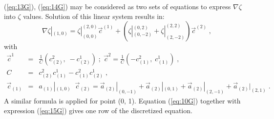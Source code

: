 \documentclass[12pt]{book}
\begin{document}
(\ref{eq:13G}), (\ref{eq:14G}) may be considered as two sets of equations
to express $\nabla \zeta$ into $\zeta$ values. Solution of this linear
system results in:
\begin{equation}
\nabla \zeta |_{(1,0)} = \zeta |^{(2,0)}_{(0,0)} \vec{c}^{(1)} +
(\zeta|^{(0,2)}_{(0, -2)} + \zeta |^{(2,2)}_{(2,-2)})\vec{c}^{(2)}\;,
\label{eq:15G}
\end{equation}
with
\begin{eqnarray}
\vec{c}^{1}&=&\frac{1}{C}(c^{2}_{(2)}, \; -c^{1}_{(2)})\; ; \; \vec{c}^{2} =
\frac{1}{C}(-c^{2}_{(1)}, \; c^{1}_{(1)})\;,\label{eq:16aG}\\
C&=&c^{2}_{(2)}c^{1}_{(1)} - c^{2}_{(1)}c^{1}_{(2)}\;,\label{eq:16bG}\\
\vec{c}_{(1)}&=&a_{(1)}|_{(1,0)}\; \; \vec{c}_{(2)} = \vec{a}_{(2)}|_{(0,-1)} +
\vec{a}_{(2)}|_{(0,1)} + \vec{a}_{(2)}|_{(2, -1)} + \vec{a}_{(2)}|_{(2,1)}\;.
\label{eq:16c}
\end{eqnarray}
A similar formula is applied for point (0, 1). Equation (\ref{eq:10G})
together with expression (\ref{eq:15G}) gives one row of the discretized
equation.
%
\end{document}
